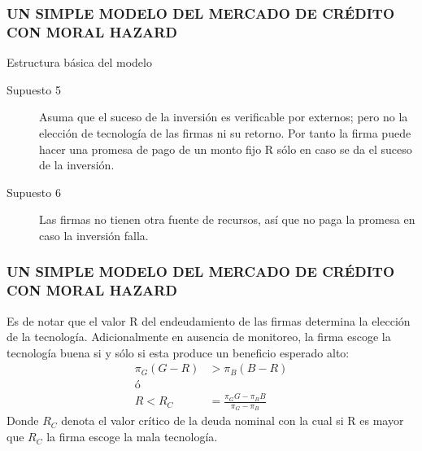 \begin{frame}
    \frametitle{{\normalsize UN SIMPLE MODELO DEL MERCADO DE CRÉDITO CON MORAL HAZARD} {}}
    
    \begin{block} {Estructura básica del modelo}
        \begin{description}
             \item[Supuesto 5] Asuma que el suceso de la inversión es verificable por externos; pero no la elección de tecnología de las firmas ni su retorno. Por tanto la firma puede hacer una promesa de pago de un monto fijo R sólo en caso se da el suceso de la inversión.
            \item[Supuesto 6] Las firmas no tienen otra fuente de recursos, así que no paga la promesa en caso la inversión falla.
            
        \end{description}
          
    \end{block}	

 
\end{frame}

\begin{frame}
\frametitle{{\normalsize UN SIMPLE MODELO DEL MERCADO DE CRÉDITO CON MORAL HAZARD} {}}

Es de notar que el valor R del endeudamiento de las firmas determina la elección de la tecnología. Adicionalmente en ausencia de monitoreo, la firma escoge la tecnología buena si y sólo si esta produce un beneficio esperado alto:
\begin{align}
\pi_{G}(G-R)&>\pi_{B}(B-R) \\
ó \nonumber \\
R<R_{C}&=\frac{\pi_{G}G-\pi_{B}B}{\pi_{G}-\pi_{B}}    
\end{align}
Donde $R_{C}$ denota el valor crítico de la deuda nominal con la cual si R es mayor que $R_{C}$ la firma escoge la mala tecnología. 
\end{frame}

